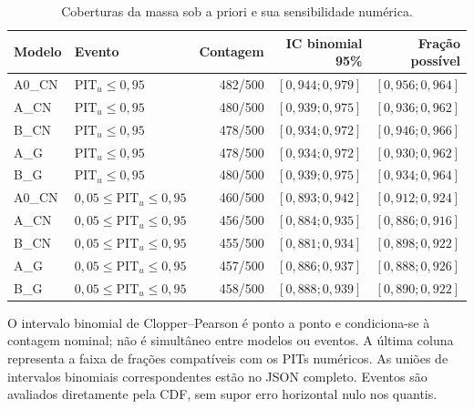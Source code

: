 \begin{table}[htbp]
\centering
\caption{Coberturas da massa sob a priori e sua sensibilidade numérica.}
\label{tab:c07-cobertura-massa}
\begingroup\small\setlength{\tabcolsep}{4pt}
\begin{tabular}{@{}llrrr@{}}
\toprule
Modelo & Evento & Contagem & IC binomial 95\% & Fração possível \\
\midrule
A0\_CN & $\mathrm{PIT}_u\leq0{,}95$ & 482/500 & $[0{,}944;0{,}979]$ & $[0{,}956;0{,}964]$ \\
A\_CN & $\mathrm{PIT}_u\leq0{,}95$ & 480/500 & $[0{,}939;0{,}975]$ & $[0{,}936;0{,}962]$ \\
B\_CN & $\mathrm{PIT}_u\leq0{,}95$ & 478/500 & $[0{,}934;0{,}972]$ & $[0{,}946;0{,}966]$ \\
A\_G & $\mathrm{PIT}_u\leq0{,}95$ & 478/500 & $[0{,}934;0{,}972]$ & $[0{,}930;0{,}962]$ \\
B\_G & $\mathrm{PIT}_u\leq0{,}95$ & 480/500 & $[0{,}939;0{,}975]$ & $[0{,}934;0{,}964]$ \\
A0\_CN & $0{,}05\leq\mathrm{PIT}_u\leq0{,}95$ & 460/500 & $[0{,}893;0{,}942]$ & $[0{,}912;0{,}924]$ \\
A\_CN & $0{,}05\leq\mathrm{PIT}_u\leq0{,}95$ & 456/500 & $[0{,}884;0{,}935]$ & $[0{,}886;0{,}916]$ \\
B\_CN & $0{,}05\leq\mathrm{PIT}_u\leq0{,}95$ & 455/500 & $[0{,}881;0{,}934]$ & $[0{,}898;0{,}922]$ \\
A\_G & $0{,}05\leq\mathrm{PIT}_u\leq0{,}95$ & 457/500 & $[0{,}886;0{,}937]$ & $[0{,}888;0{,}926]$ \\
B\_G & $0{,}05\leq\mathrm{PIT}_u\leq0{,}95$ & 458/500 & $[0{,}888;0{,}939]$ & $[0{,}890;0{,}922]$ \\
\bottomrule
\end{tabular}
\endgroup
\par\smallskip\begin{minipage}{0.96\textwidth}\footnotesize O intervalo binomial de Clopper--Pearson é ponto a ponto e condiciona-se à contagem nominal; não é simultâneo entre modelos ou eventos. A última coluna representa a faixa de frações compatíveis com os PITs numéricos. As uniões de intervalos binomiais correspondentes estão no JSON completo. Eventos são avaliados diretamente pela CDF, sem supor erro horizontal nulo nos quantis.\end{minipage}
\end{table}
